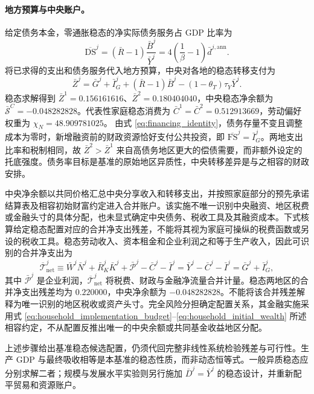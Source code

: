 \documentclass[12pt,UTF8]{ctexart}
\newcommand{\DS}{\mathrm{DS}}
\newcommand{\FS}{\mathrm{FS}}
\begin{document}
	\paragraph{地方预算与中央账户。}
	给定债务本金，零通胀稳态的净实际债务服务占 GDP 比率为
	\begin{equation}
		\overline{\DS}^j=(\bar R-1)\frac{\bar B^j}{\bar Y^j}
		=4\left(\frac1\beta-1\right)\bar d^{j,\mathrm{ann}}.
	\end{equation}
	将已求得的支出和债务服务代入地方预算，中央对各地的稳态转移支付为
	\begin{equation}
		\bar Z^j=\bar G^j+\bar I_G^j
		+(\bar R-1)\bar B^j-(1-\theta_T)\tau_Y\bar Y^j.
	\end{equation}
	稳态求解得到 $\bar Z^1=0.156161616$、$\bar Z^2=0.180404040$，中央稳态净余额为 $\bar{\mathcal S}^C=-0.048282828$。代表性家庭稳态消费为 $\bar C^1=\bar C^2=0.512913669$，劳动偏好权重为 $\chi_N=48.909781025$。 由式 \eqref{eq:financing_identity}，债务存量不变且调整成本为零时，新增融资前的财政资源恰好支付公共投资，即 $\overline{\FS}^j=\bar I_G^j$。两地支出比率和税制相同，故 $\bar Z^2>\bar Z^1$ 来自高债务地区更大的偿债需要，而非额外设定的托底强度。债务率目标是基准的原始地区异质性，中央转移差异是与之相容的财政安排。
	
	中央净余额以共同价格汇总中央分享收入和转移支出，并按照家庭部分的预先承诺结算表及相容初始财富约定进入合并账户。该实施不唯一识别中央融资、地区税费或金融头寸的具体分配，也未显式确定中央债务、税收工具及其融资成本。下式核算给定稳态配置对应的合并净支出残差，不能将其视为家庭可操纵的税费函数或另设的税收工具。稳态劳动收入、资本租金和企业利润之和等于生产收入，因此可识别的合并净支出为
\begin{equation}
\overline{\mathcal T}_{\mathrm{net}}^j
\equiv \bar W^j\bar N^j+\bar R_K^j\bar K^j+\bar{\mathcal P}^j-\bar C^j-\bar I^j
=\bar Y^j-\bar C^j-\bar I^j=\bar G^j+\bar I_G^j,
\end{equation}
其中 $\bar{\mathcal P}^j$ 是企业利润，$\overline{\mathcal T}_{\mathrm{net}}^j$ 将税费、财政与金融净流量合并计量。稳态两地区的合并净支出残差均为 $0.220000$，中央净余额为 $-0.048282828$。不能将该合并残差解释为唯一识别的地区税收或资产头寸。完全风险分担确定配置关系，其金融实施采用式 \eqref{eq:household_implementation_budget}--\eqref{eq:household_initial_wealth} 所述相容约定，不从配置反推出唯一的中央余额或共同基金收益地区分配。
	
	上述步骤给出基准稳态候选配置，仍须代回完整非线性系统检验残差与可行性。生产 GDP 与最终吸收相等是本基准的稳态性质，而非动态恒等式。一般异质稳态应分别求解二者；规模与发展水平实验则另行施加 $\bar D^j=\bar Y^j$ 的稳态设计，并重新配平贸易和资源账户。
	
\end{document}
